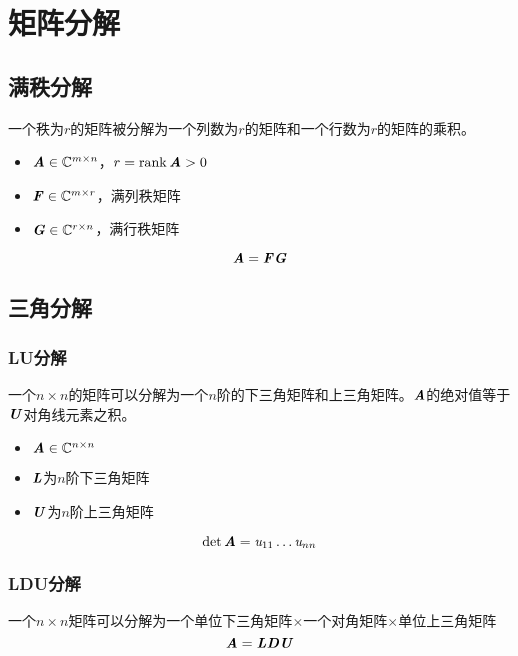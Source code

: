 \chapter{矩阵分解}
\label{cha:矩阵分解}

\section{满秩分解}
\label{sec:满秩分解}

\begin{definition}[满秩分解]
    一个秩为$r$的矩阵被分解为一个列数为$r$的矩阵和一个行数为$r$的矩阵的乘积。
    \begin{itemize}
        \item $\boldsymbol{\mathit{A}} \in \mathbb{C}^{m \times n}$，$r = \mathrm{rank}\, \boldsymbol{\mathit{A}} > 0$
        \item $\boldsymbol{\mathit{F}} \in \mathbb{C}^{m \times r}$，满列秩矩阵
        \item $\boldsymbol{\mathit{G}} \in \mathbb{C}^{r \times n}$，满行秩矩阵
    \end{itemize}
    $$
    \boldsymbol{\mathit{A}} = \boldsymbol{\mathit{F}} \boldsymbol{\mathit{G}}
    $$
\end{definition}

\section{三角分解}
\label{sec:三角分解}

\subsection{LU分解}
\label{sub:LU分解}

\begin{definition}[LU分解]
    一个$n \times n$的矩阵可以分解为一个$n$阶的下三角矩阵和上三角矩阵。$\boldsymbol{\mathit{A}}$的绝对值等于$\boldsymbol{\mathit{U}}$对角线元素之积。
    \begin{itemize}
        \item $\boldsymbol{\mathit{A}} \in \mathbb{C}^{n \times n}$
        \item $\boldsymbol{\mathit{L}}$为$n$阶下三角矩阵
        \item $\boldsymbol{\mathit{U}}$为$n$阶上三角矩阵
    \end{itemize}
    $$
    \det \boldsymbol{\mathit{A}} = \mathit{u}_{11}\ldots \mathit{u}_{nn}
    $$
\end{definition}

\subsection{LDU分解}
\label{sub:LDU分解}

\begin{definition}[LDU分解]
    一个$n \times n$矩阵可以分解为一个单位下三角矩阵$\times$一个对角矩阵$\times$单位上三角矩阵
    $$
    \boldsymbol{\mathit{A}} = \boldsymbol{\mathit{L}} \boldsymbol{\mathit{D}} \boldsymbol{\mathit{U}}
    $$
\end{definition}

